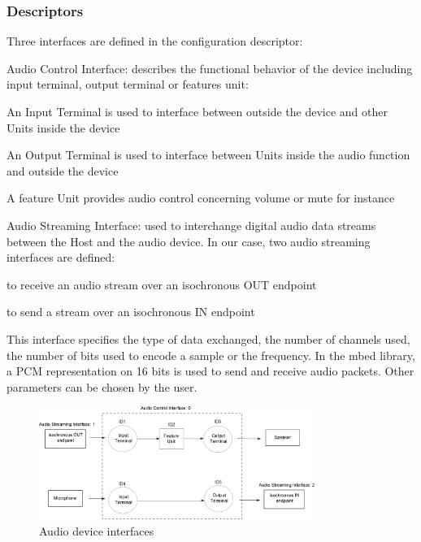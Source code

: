 \documentclass[pdftex,10pt,a4paper]{report}
\newenvironment{packed_item}{
\begin{itemize}
  \setlength{\itemsep}{1pt}
  \setlength{\parskip}{0pt}
  \setlength{\parsep}{0pt}
}{\end{itemize}}
\begin{document}
\subsubsection{Descriptors}
Three interfaces are defined in the configuration descriptor:
\begin{packed_item}
	\item Audio Control Interface: describes the functional behavior of the device including input terminal, output terminal or features unit:
	\begin{packed_item}
		\item An Input Terminal is used to interface between outside the device and other Units inside the device
		\item An Output Terminal is used to interface between Units inside the audio function and outside the device
		\item A feature Unit provides audio control concerning volume or mute for instance
	\end{packed_item}
	
	\item Audio Streaming Interface: used to interchange digital audio data streams between the Host and the audio device. In our case, two audio streaming interfaces are defined:
	\begin{packed_item}
		\item to receive an audio stream over an isochronous OUT endpoint
		\item to send a stream over an isochronous IN endpoint
	\end{packed_item}
	This interface specifies the type of data exchanged, the number of channels used, the number of bits used to encode a sample or the frequency. In the mbed library, a PCM representation on 16 bits is used to send and receive audio packets. Other parameters can be chosen by the user.
\end{packed_item}

\begin{figure}[h!]
		\centering
		\includegraphics[width=0.8\textwidth]{./audio_archi.jpg}
		\caption{Audio device interfaces}
		\label{Audio device interfaces}
\end{figure}
\end{document}
